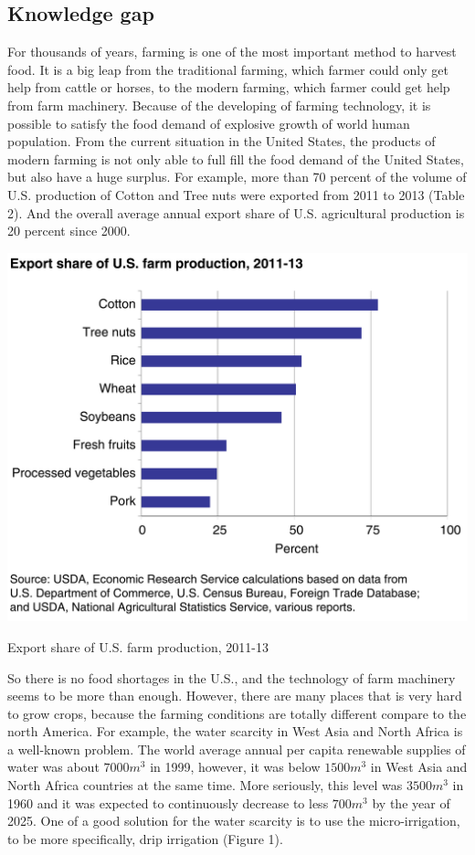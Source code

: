 \documentclass[12pt]{article}
\begin{document}
\begin{flushleft}
\subsection{Knowledge gap}
For thousands of years, farming is one of the most important method to harvest food. It is a big leap from the traditional farming, which farmer could only get help from cattle or horses, to the modern farming, which farmer could get help from farm machinery. Because of the developing of farming technology, it is possible to satisfy the food demand of explosive growth of world human population. From the current situation in the United States, the products of modern farming is not only able to full fill the food demand of the United States, but also have a huge surplus. For example, more than 70 percent of the volume of U.S. production of Cotton and Tree nuts were exported from 2011 to 2013 (Table 2). And the overall average annual export share of U.S. agricultural production is 20 percent since 2000. \cite{Exports}
\begin{table}[ht!]
	\begin{center}
		\includegraphics[scale = 0.4]{cropexport.png}
		\caption{Export share of U.S. farm production, 2011-13}
	\end{center}
\end{table}
So there is no food shortages in the U.S., and the technology of farm machinery seems to be more than enough. However, there are many places that is very hard to grow crops, because the farming conditions are totally different compare to the north America. For example, the water scarcity in West Asia and North Africa is a well-known problem. The world average annual per capita renewable supplies of water was about $7000 m^{3}$ in 1999, however, it was below $1500 m^{3}$ in West Asia and North Africa countries at the same time. More seriously, this level was $3500 m^{3}$ in 1960 and it was expected to continuously decrease to less $700 m^{3}$ by the year of 2025. \cite{margat1999water} One of a good solution for the water scarcity is to use the micro-irrigation, to be more specifically, drip irrigation (Figure 1). 

\end{flushleft}
\end{document}
